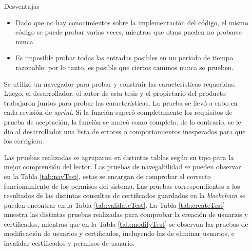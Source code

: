 Desventajas

\begin{itemize}
\item Dado que no hay conocimientos sobre la implementación del código, el mismo código se puede probar varias veces, mientras que otras pueden no probarse nunca.
\item Es imposible probar todas las entradas posibles en un período de tiempo razonable; por lo tanto, es posible que ciertos caminos nunca se prueben.
\end{itemize}

Se utilizó un navegador para probar y construir las características requeridas. Luego, el desarrollador, el autor de esta tesis y el propietario del producto trabajaron juntos para probar las características. La prueba se llevó a cabo en cada revisión de \textit{sprint}. Si la función superó completamente los requisitos de prueba de aceptación, la función se marcó como completa; de lo contrario, se le dio al desarrollador una lista de errores o comportamientos inesperados para que los corrigiera.

Las pruebas realizadas se agruparon en distintas tablas según su tipo para la mejor comprensión del lector. Las pruebas de navegabilidad se pueden observar en la Tabla \ref{tab:navTest}, estas se encargan de comprobar el correcto funcionamiento de los permisos del sistema. Las pruebas correspondientes a los resultados de las distintas consultas de certificados guardados en la \textit{blockchain} se pueden encontrar en la Tabla \ref{tab:validateTest}. La Tabla \ref{tab:createTest} muestra las distintas pruebas realizadas para comprobar la creación de usuarios y certificados, mientras que en la Tabla \ref{tab:modifyTest} se observan las pruebas de modificación de usuarios y certificados, incluyendo las de eliminar usuarios, e invalidar certificados y permisos de usuario.


